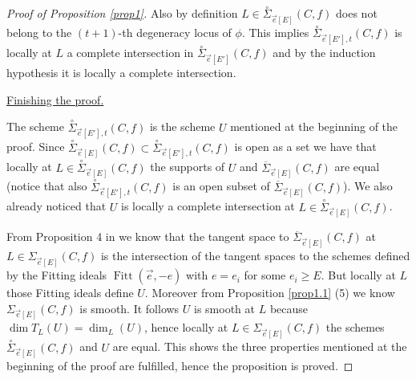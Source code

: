 \documentclass{article}
\DeclareMathOperator{\Fitt}{Fitt}
\theoremstyle{definition}
\theoremstyle{remark}
\begin{document}
\begin{proof}[Proof of Proposition \ref{prop1}]

Also by definition $L \in \overset{\circ}{\Sigma}_{\overrightarrow {e}[E]}(C,f)$ does not belong to the $(t+1)$-th degeneracy locus of $\phi$.
This  implies $\overset {\circ}{\Sigma}_{\overrightarrow {e}[E'],t}(C,f)$ is locally at $L$ a complete intersection in $\overset {\circ}{\Sigma} _{\overrightarrow {e}[E']}(C,f)$ and by the induction hypothesis it is locally a complete intersection.

\underline{Finishing the proof.}

The scheme $\overset {\circ}{\Sigma}_{\overrightarrow {e}[E'],t}(C,f)$ is the scheme $U$ mentioned at the beginning of the proof.
Since $\overset {\circ}{\Sigma}_{\overrightarrow {e}[E]}(C,f)\subset \overset {\circ}{\Sigma}_{\overrightarrow {e}[E'],t}(C,f)$ is open as a set we have that locally at $L \in \overset {\circ}{\Sigma}_{\overrightarrow {e}[E]}(C,f)$ the supports of $U$ and $\overline{\Sigma}_{\overrightarrow{e}[E]} (C,f)$ are equal (notice that also $\overset {\circ}{\Sigma}_{\overrightarrow {e}[E'],t}(C,f)$ is an open subset of $\overline{\Sigma}_{\overrightarrow{e}[E]} (C,f)$).
We also already noticed that $U$ is locally a complete intersection at  $L \in \overset {\circ}{\Sigma}_{\overrightarrow {e}[E]}(C,f)$.

From Proposition 4 in \cite {ref2} we know that the tangent space to $\overline {\Sigma}_{\overrightarrow {e}[E]}(C,f)$ at $L \in \Sigma _{\overrightarrow {e}[E]}(C,f)$ is the intersection of the tangent spaces to the schemes defined by the Fitting ideals $\Fitt (\overrightarrow {e},-e)$ with $e=e_i$ for some $e_i \geq E$.
But locally at $L$ those Fitting ideals define $U$.
Moreover from Proposition \ref{prop1.1} (5) we know $\Sigma _{\overrightarrow {e}[E]}(C,f)$ is smooth.
It follows $U$ is smooth at $L$ because $\dim T_L(U)=\dim_L (U)$, hence locally at $L \in \Sigma _{\overrightarrow {e}[E]}(C,f)$ the schemes $\overset {\circ}{\Sigma} _{\overrightarrow {e}[E]}(C,f)$ and $U$ are equal.
This shows the three properties mentioned at the beginning of the proof are fulfilled, hence the proposition is proved.
\end{proof}
\end{document}
